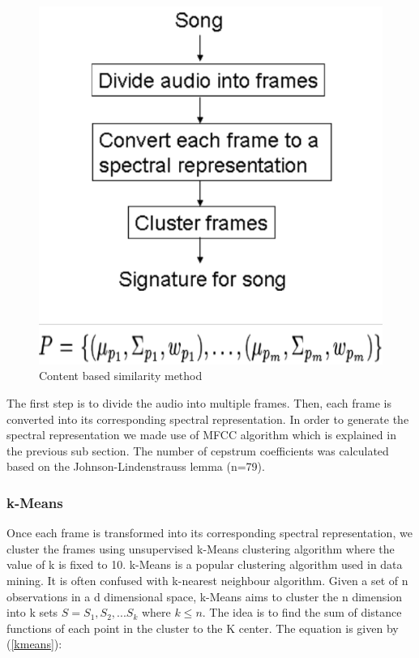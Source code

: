 \documentclass[12pt]{article}
\begin{document}
\begin{figure}[h]\label{content}
\center
\includegraphics{fig1.png}
\caption{Content based similarity method}
\end{figure}

The first step is to divide the audio into multiple frames. Then, each frame is converted into its corresponding spectral representation. In order to generate the spectral representation we made use of MFCC algorithm which is explained in the previous sub section. The number of cepstrum coefficients was calculated based on the Johnson-Lindenstrauss lemma (n=79).

\subsubsection{k-Means}
Once each frame is transformed into its corresponding spectral representation, we cluster the frames using unsupervised k-Means clustering algorithm where the value of k is fixed to 10. k-Means is a popular clustering algorithm used in data mining. It is often confused with k-nearest neighbour algorithm. Given a set of n observations in a d dimensional space, k-Means aims to cluster the n dimension into k sets $S = {S_1,S_2,...S_k}$ where $ k \leq n$. The idea is to find the sum of distance functions of each point in the cluster to the K center. The equation is given by (\ref{kmeans}):
\end{document}
